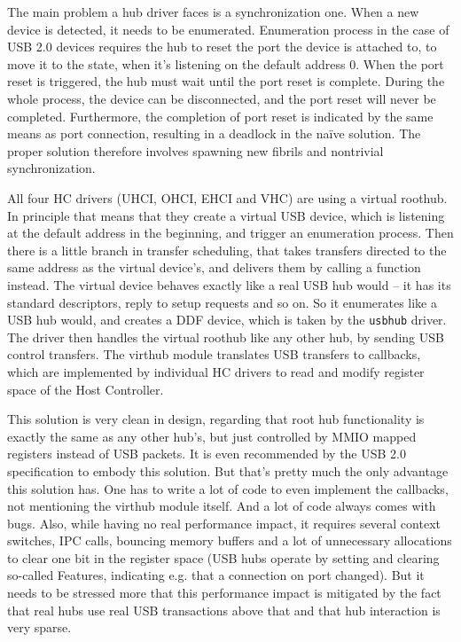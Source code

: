 The main problem a hub driver faces is a synchronization one. When a new device
is detected, it needs to be enumerated. Enumeration process in the case of USB 2.0
devices requires the hub to reset the port the device is attached to, to move
it to the  state, when it's listening on the default address 0.
When the port reset is triggered, the hub must wait until the port reset is
complete. During the whole process, the device can be disconnected, and the
port reset will never be completed. Furthermore, the completion of port reset
is indicated by the same means as port connection, resulting in a deadlock in
the na\"ive solution. The proper solution therefore involves spawning new
fibrils and nontrivial synchronization.

All four HC drivers (UHCI, OHCI, EHCI and VHC) are using a virtual roothub. In
principle that means that they create a virtual USB device, which is listening
at the default address in the beginning, and trigger an enumeration process.
Then there is a little branch in transfer scheduling, that takes transfers
directed to the same address as the virtual device's, and delivers them by
calling a function instead. The virtual device behaves exactly like a real USB
hub would -- it has its standard descriptors, reply to setup requests and so
on. So it enumerates like a USB hub would, and creates a DDF device, which is
taken by the \texttt{usbhub} driver. The driver then handles the virtual
roothub like any other hub, by sending USB control transfers. The virthub
module translates USB transfers to callbacks, which are implemented by
individual HC drivers to read and modify register space of the Host Controller.

This solution is very clean in design, regarding that root hub functionality is
exactly the same as any other hub's, but just controlled by MMIO mapped
registers instead of USB packets. It is even recommended by the USB 2.0			%
specification to embody this solution. But that's pretty much the only advantage
this solution has. One has to write a lot of code to even implement the
callbacks, not mentioning the virthub module itself. And a lot of code always
comes with bugs. Also, while having no real performance impact, it requires
several context switches, IPC calls, bouncing memory buffers and a lot of
unnecessary allocations to clear one bit in the register space (USB hubs
operate by setting and clearing so-called Features, indicating e.g. that
a connection on port changed). But it needs to be stressed more that this
performance impact is mitigated by the fact that real hubs use real USB transactions
above that and that hub interaction is very sparse.

